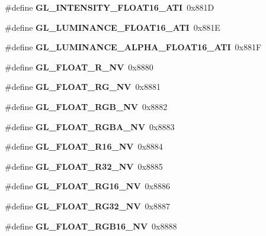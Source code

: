 \begin{DoxyCompactItemize}
\item 
\#define {\bfseries G\+L\+\_\+\+I\+N\+T\+E\+N\+S\+I\+T\+Y\+\_\+\+F\+L\+O\+A\+T16\+\_\+\+A\+T\+I}~0x881\+D\label{_s_d_l__opengl_8h_a5ace64eda1fdea76a35f1124377e311c}

\item 
\#define {\bfseries G\+L\+\_\+\+L\+U\+M\+I\+N\+A\+N\+C\+E\+\_\+\+F\+L\+O\+A\+T16\+\_\+\+A\+T\+I}~0x881\+E\label{_s_d_l__opengl_8h_aeded330853753d93124eedcf2c8365d5}

\item 
\#define {\bfseries G\+L\+\_\+\+L\+U\+M\+I\+N\+A\+N\+C\+E\+\_\+\+A\+L\+P\+H\+A\+\_\+\+F\+L\+O\+A\+T16\+\_\+\+A\+T\+I}~0x881\+F\label{_s_d_l__opengl_8h_a9faa131e152b7d30fc90378843ba582b}

\item 
\#define {\bfseries G\+L\+\_\+\+F\+L\+O\+A\+T\+\_\+\+R\+\_\+\+N\+V}~0x8880\label{_s_d_l__opengl_8h_a0e35b68a0ca3960e4d02007f106cdc95}

\item 
\#define {\bfseries G\+L\+\_\+\+F\+L\+O\+A\+T\+\_\+\+R\+G\+\_\+\+N\+V}~0x8881\label{_s_d_l__opengl_8h_af544133b3fc28eec104fa2e5e2bdef8a}

\item 
\#define {\bfseries G\+L\+\_\+\+F\+L\+O\+A\+T\+\_\+\+R\+G\+B\+\_\+\+N\+V}~0x8882\label{_s_d_l__opengl_8h_a3d47cb109295288fb9fed9ec48a95099}

\item 
\#define {\bfseries G\+L\+\_\+\+F\+L\+O\+A\+T\+\_\+\+R\+G\+B\+A\+\_\+\+N\+V}~0x8883\label{_s_d_l__opengl_8h_a0b793163fa49e8baefa8780ca156a54c}

\item 
\#define {\bfseries G\+L\+\_\+\+F\+L\+O\+A\+T\+\_\+\+R16\+\_\+\+N\+V}~0x8884\label{_s_d_l__opengl_8h_afc28347faf59afb2ef318fc617e7389d}

\item 
\#define {\bfseries G\+L\+\_\+\+F\+L\+O\+A\+T\+\_\+\+R32\+\_\+\+N\+V}~0x8885\label{_s_d_l__opengl_8h_a74e1ea14a404cc3b3accfc80371a551e}

\item 
\#define {\bfseries G\+L\+\_\+\+F\+L\+O\+A\+T\+\_\+\+R\+G16\+\_\+\+N\+V}~0x8886\label{_s_d_l__opengl_8h_a06d19ca1e5717f3be88b879eb37b03f0}

\item 
\#define {\bfseries G\+L\+\_\+\+F\+L\+O\+A\+T\+\_\+\+R\+G32\+\_\+\+N\+V}~0x8887\label{_s_d_l__opengl_8h_a42fb7f602cd23d7f26f43b2c110f54a0}

\item 
\#define {\bfseries G\+L\+\_\+\+F\+L\+O\+A\+T\+\_\+\+R\+G\+B16\+\_\+\+N\+V}~0x8888\label{_s_d_l__opengl_8h_aafa13cc0aa82c1ebe98c7900362c7e90}


\end{DoxyCompactItemize}
